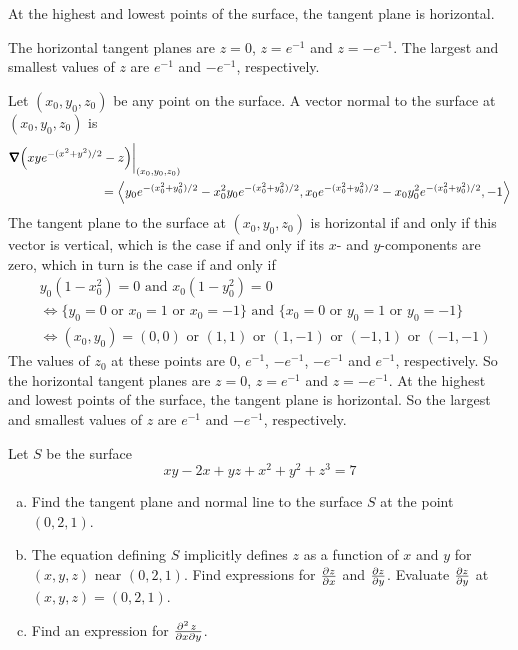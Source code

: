 \begin{hint}
At the highest and lowest points of the surface, the tangent plane is horizontal.
\end{hint}

\begin{answer}
The horizontal tangent planes are $z=0$, $z=e^{-1}$ and $z=-e^{-1}$.
The largest and smallest values of $z$ are $e^{-1}$ and $-e^{-1}$, respectively.
\end{answer}

\begin{solution}
Let $(x_0,y_0,z_0)$ be any point on the surface. A vector
normal to the surface at $(x_0,y_0,z_0)$ is
\begin{align*}
&\vnabla\Big(xy e^{-(x^2+y^2)/2}-z\Big)\bigg|_{(x_0,y_0,z_0)} 
\\&\hskip1in
=\llt y_0 e^{-(x_0^2+y_0^2)/2}-x_0^2y_0 e^{-(x_0^2+y_0^2)/2},
      x_0 e^{-(x_0^2+y_0^2)/2}-x_0y_0^2 e^{-(x_0^2+y_0^2)/2},-1\rgt
\end{align*}
The tangent plane to the surface at $(x_0,y_0,z_0)$ is horizontal
if and only if this vector is vertical, which is the case 
if and only if its $x$- and $y$-components are
zero, which in turn is the case if and only if
\begin{align*}
&y_0(1-x_0^2)=0\text{ and }x_0(1-y_0^2)=0\\
&\iff\big\{y_0=0\text{ or }x_0=1\text{ or }x_0=-1\big\}
   \text{ and }\big\{x_0=0\text{ or }y_0=1\text{ or }y_0=-1\big\}\\
&\iff (x_0,y_0)=(0,0)\text{ or }(1,1)\text{ or }(1,-1)
   \text{ or }(-1,1)\text{ or }(-1,-1)
\end{align*}
The values of $z_0$ at these points are $0$, $e^{-1}$, $-e^{-1}$, $-e^{-1}$ 
and $e^{-1}$, respectively. So the horizontal tangent planes are
$z=0$, $z=e^{-1}$ and $z=-e^{-1}$.
At the highest and lowest points of the surface, the tangent plane is horizontal.
So the largest and smallest values of $z$ are $e^{-1}$ and $-e^{-1}$, respectively.


\end{solution}

\begin{question}[M200 2004A] %
Let $S$ be the surface
\begin{equation*}
xy-2x+yz+x^2+y^2+z^3=7
\end{equation*}
\begin{enumerate}[(a)]
\item
Find the tangent plane and normal line to the surface $S$
at the point $(0,2,1)$.
\item  
The equation defining $S$ implicitly defines $z$ as a 
function of $x$ and $y$ for $(x,y,z)$ near $(0,2,1)$. Find expressions for 
$\pdiff{z}{x}$ and 
$\pdiff{z}{y}$. Evaluate
$\pdiff{z}{y}$ at $(x,y,z)=(0,2,1)$.
\item   
Find an expression for 
$\frac{\partial^2\hfil z\hfil\,}{\partial x\partial y}$. 
\end{enumerate}
\end{question}

